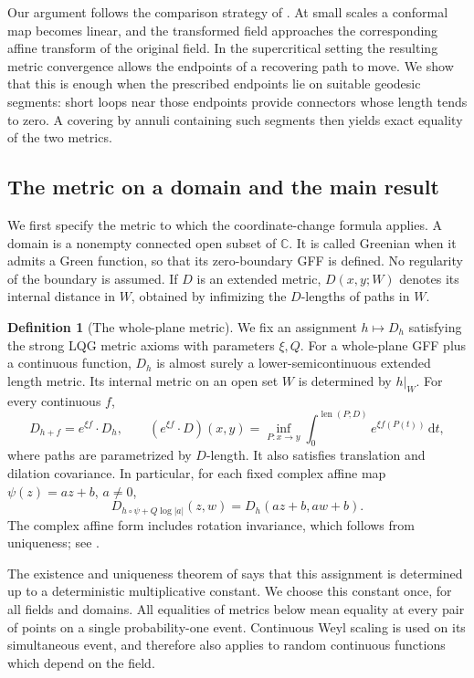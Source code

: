 \documentclass[11pt]{article}
\theoremstyle{definition}
\newtheorem{definition}[theorem]{Definition}
\theoremstyle{remark}
\newcommand{\C}{\mathbb C}
\newcommand{\len}{\operatorname{len}}
\newcommand{\dd}{\,\mathrm d}
\begin{document}
Our argument follows the comparison strategy of \cite{GM}. At small
scales a conformal map becomes linear, and the transformed field
approaches the corresponding affine transform of the original field.
In the supercritical setting the resulting metric convergence allows
the endpoints of a recovering path to move. We show that this is
enough when the prescribed endpoints lie on suitable geodesic
segments: short loops near those endpoints provide connectors whose
length tends to zero. A covering by annuli containing such segments
then yields exact equality of the two metrics.

\subsection{The metric on a domain and the main result}
We first specify the metric to which the coordinate-change formula
applies. A domain is a nonempty connected open subset of $\C$.
It is called Greenian when it admits a Green function, so that its
zero-boundary GFF is defined. No regularity of the boundary is assumed.
If $D$ is an extended metric, $D(x,y;W)$ denotes its internal distance
in $W$, obtained by infimizing the $D$-lengths of paths in $W$.

\begin{definition}[The whole-plane metric]\label{def:whole}
We fix an assignment $h\mapsto D_h$ satisfying the strong LQG metric
axioms with parameters $\xi,Q$. For a whole-plane GFF plus a
continuous function, $D_h$ is almost surely a lower-semicontinuous
extended length metric. Its internal metric on an open set $W$ is
determined by $h|_W$. For every continuous $f$,
\begin{equation}\label{eq:weyl}
 D_{h+f}=e^{\xi f}\cdot D_h,
 \qquad
 (e^{\xi f}\cdot D)(x,y)
 =\inf_{P:x\to y}\int_0^{\len(P;D)}e^{\xi f(P(t))}\dd t,
\end{equation}
where paths are parametrized by $D$-length. It also satisfies
translation and dilation covariance. In particular, for each fixed
complex affine map $\psi(z)=az+b$, $a\ne0$,
\begin{equation}\label{eq:affine}
 D_{h\circ\psi+Q\log|a|}(z,w)=D_h(az+b,aw+b).
\end{equation}
The complex affine form includes rotation invariance, which follows
from uniqueness; see \cite[Proposition 1.9]{DG}.
\end{definition}

The existence and uniqueness theorem of \cite{DG} says that this
assignment is determined up to a deterministic multiplicative
constant. We choose this constant once, for all fields and domains.
All equalities of metrics below mean equality at every pair of points
on a single probability-one event. Continuous Weyl scaling is used
on its simultaneous event, and therefore also applies to random
continuous functions which depend on the field.
\end{document}
